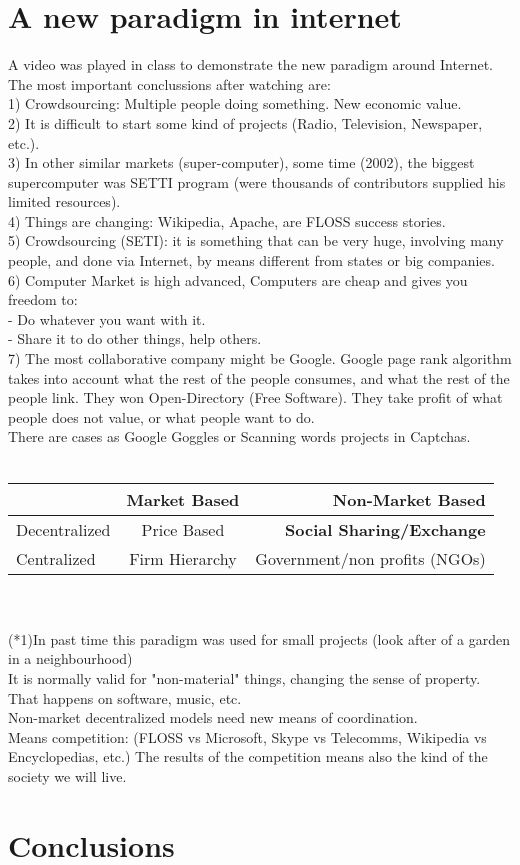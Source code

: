 \section{A new paradigm in internet}\label{MARKET_FLOSS} 

A video was played in class to demonstrate the new paradigm around Internet. The most important conclussions after watching are:\\
1) Crowdsourcing: Multiple people doing something. New economic value.\\ 
2) It is difficult to start some kind of projects (Radio, Television, Newspaper, etc.).\\ 
3) In other similar markets (super-computer), some time (2002), the biggest supercomputer was SETTI program (were thousands of contributors supplied his limited resources).\\
4) Things are changing: Wikipedia, Apache, are FLOSS success stories.\\
5) Crowdsourcing (SETI): it is something that can be very huge, involving many people, and done via Internet, by means different from states or big companies.\\
6) Computer Market is high advanced, Computers are cheap and gives you freedom to:\\
- Do whatever you want with it.\\
- Share it to do other things, help others.\\
7) The most collaborative company might be Google. Google page rank algorithm takes into account what the rest of the people consumes, and what the rest of the people link. They won Open-Directory (Free Software). They take profit of what people does not value, or what people want to do.\\
There are cases as Google Goggles or Scanning words projects in Captchas.\\
\\
\begin{tabular}{| l | c | r |}
   \hline
   & Market Based & Non-Market Based \\
   \hline
   Decentralized  & Price Based    & \textbf{Social Sharing/Exchange} \\
   \hline
   Centralized    & Firm Hierarchy & Government/non profits (NGOs) \\
   \hline
\end{tabular}
\\
\\
(*1)In past time this paradigm was used for small projects (look after of a garden in a neighbourhood)\\
It is normally valid for "non-material" things, changing the sense of property. That happens on software, music, etc.\\
Non-market decentralized models need new means of coordination.\\
Means competition: (FLOSS vs Microsoft, Skype vs Telecomms, Wikipedia vs Encyclopedias, etc.)
The results of the competition means also the kind of the society we will live.


\section{Conclusions}\label{conclusions}
 
